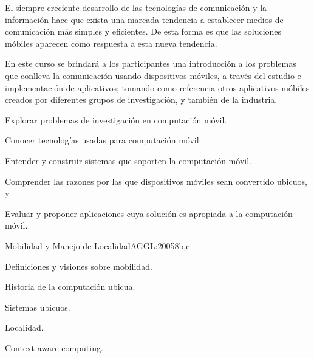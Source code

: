 \begin{syllabus}


\begin{justification}
El siempre creciente desarrollo de las tecnologías de comunicación y la
información hace que exista una marcada tendencia a  establecer medios de 
comunicación más simples y eficientes. De esta forma es que las soluciones
móbiles aparecen como respuesta a esta nueva tendencia.

En este curso se brindará a los participantes una introducción a los
problemas que conlleva la comunicación usando dispositivos móviles, a través del
estudio e implementación de aplicativos; tomando como referencia otros aplicativos
móbiles creados por diferentes grupos de investigación, y también de la industria.

\end{justification}

\begin{goals}
      \item Explorar problemas de investigación en computación móvil.
      \item Conocer tecnologías usadas para computación móvil.
      \item Entender y construir sistemas que soporten la computación móvil.
      \item Comprender las razones por las que dispositivos móviles sean convertido ubicuos, y
      \item Evaluar y proponer aplicaciones cuya solución es apropiada a la computación móvil.

\end{goals}

\begin{outcomes}
\end{outcomes}

\begin{unit}{Mobilidad y Manejo de Localidad}{AGGL:2005}{8}{b,c}
   \begin{topics}
     \item Definiciones y visiones sobre mobilidad.
     \item Historia de la computación ubicua.
     \item Sistemas ubicuos.
     \item Localidad.
     \item Context aware computing.
   \end{topics}


\end{unit}
\end{syllabus}

